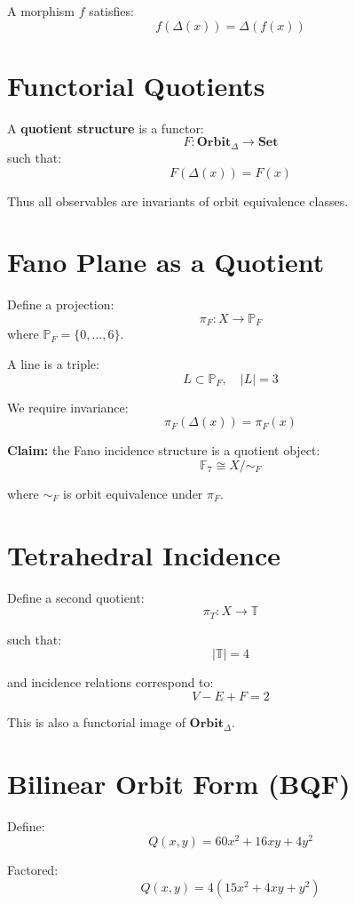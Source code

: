 \documentclass[11pt]{article}
\begin{document}
A morphism $f$ satisfies:
\[
f(\Delta(x)) = \Delta(f(x))
\]

\section{Functorial Quotients}

A \textbf{quotient structure} is a functor:
\[
F : \mathbf{Orbit}_{\Delta} \to \mathbf{Set}
\]
such that:
\[
F(\Delta(x)) = F(x)
\]

Thus all observables are invariants of orbit equivalence classes.

\section{Fano Plane as a Quotient}

Define a projection:
\[
\pi_F : X \to \mathbb{P}_F
\]
where $\mathbb{P}_F = \{0,\dots,6\}$.

A line is a triple:
\[
L \subset \mathbb{P}_F, \quad |L| = 3
\]

We require invariance:
\[
\pi_F(\Delta(x)) = \pi_F(x)
\]

\textbf{Claim:} the Fano incidence structure is a quotient object:
\[
\mathbb{F}_7 \cong X / \sim_F
\]

where $\sim_F$ is orbit equivalence under $\pi_F$.

\section{Tetrahedral Incidence}

Define a second quotient:
\[
\pi_T : X \to \mathbb{T}
\]

such that:
\[
|\mathbb{T}| = 4
\]

and incidence relations correspond to:
\[
V - E + F = 2
\]

This is also a functorial image of $\mathbf{Orbit}_\Delta$.

\section{Bilinear Orbit Form (BQF)}

Define:
\[
Q(x,y) = 60x^2 + 16xy + 4y^2
\]

Factored:
\[
Q(x,y) = 4(15x^2 + 4xy + y^2)
\]
\end{document}
